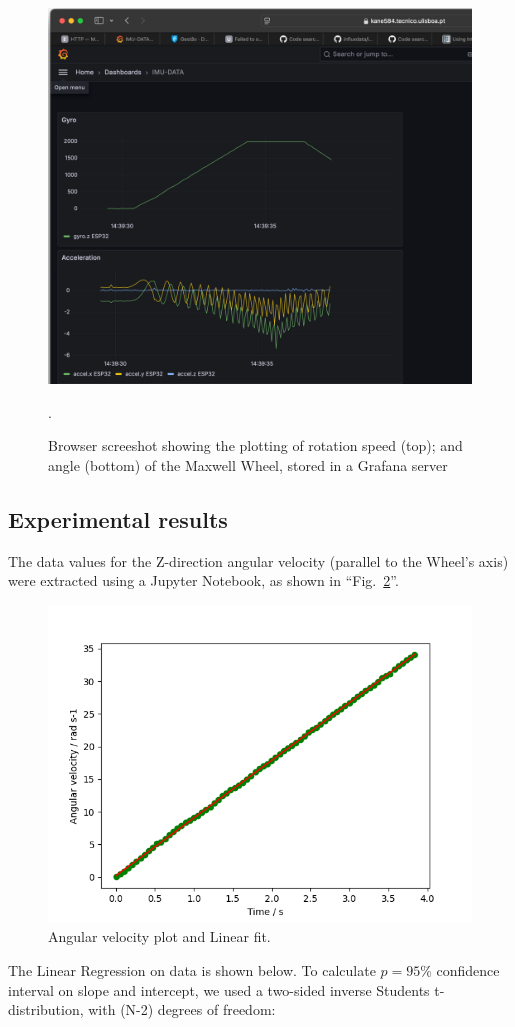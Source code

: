 \documentclass[conference]{IEEEtran}
\begin{document}
\begin{figure}[htbp]
\centerline{\includegraphics[width=.6\columnwidth]{IMUGrafana.png}}
\caption{Browser screeshot showing the  plotting of rotation speed (top); and angle (bottom) of the Maxwell Wheel, stored in a Grafana server}.
\label{figIMU}
\end{figure}


\subsection{Experimental results}
The data values for the Z-direction angular velocity (parallel to the Wheel's axis) were extracted using a Jupyter Notebook, as shown in ``Fig.~\ref{figAngleVel}''. 

\begin{figure}[htbp]
\centerline{\includegraphics[width=.8\columnwidth]{AngAccel.png}}
\caption{Angular velocity plot and Linear fit.}
\label{figAngleVel}
\end{figure}

The Linear Regression on data is shown below. 
To calculate $p=95\%$ confidence interval on slope and intercept, we used a two-sided inverse Students t-distribution, with (N-2) degrees of freedom:
\end{document}
